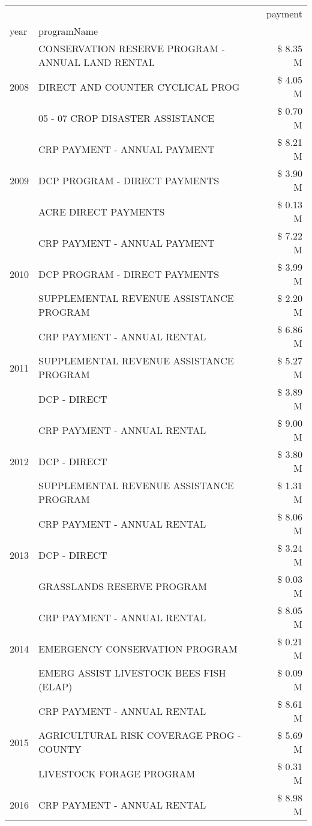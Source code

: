 \begin{tabular}{llr}
\toprule
 &  & payment \\
year & programName &  \\
\midrule
\multirow[t]{3}{*}{2008} & CONSERVATION RESERVE PROGRAM - ANNUAL LAND RENTAL & \$ 8.35 M \\
 & DIRECT AND COUNTER CYCLICAL PROG & \$ 4.05 M \\
 & 05 - 07 CROP DISASTER ASSISTANCE & \$ 0.70 M \\
\cline{1-3}
\multirow[t]{3}{*}{2009} & CRP PAYMENT - ANNUAL PAYMENT & \$ 8.21 M \\
 & DCP PROGRAM - DIRECT PAYMENTS & \$ 3.90 M \\
 & ACRE DIRECT PAYMENTS & \$ 0.13 M \\
\cline{1-3}
\multirow[t]{3}{*}{2010} & CRP PAYMENT - ANNUAL PAYMENT & \$ 7.22 M \\
 & DCP PROGRAM - DIRECT PAYMENTS & \$ 3.99 M \\
 & SUPPLEMENTAL REVENUE ASSISTANCE PROGRAM & \$ 2.20 M \\
\cline{1-3}
\multirow[t]{3}{*}{2011} & CRP PAYMENT - ANNUAL RENTAL & \$ 6.86 M \\
 & SUPPLEMENTAL REVENUE ASSISTANCE PROGRAM & \$ 5.27 M \\
 & DCP - DIRECT & \$ 3.89 M \\
\cline{1-3}
\multirow[t]{3}{*}{2012} & CRP PAYMENT - ANNUAL RENTAL & \$ 9.00 M \\
 & DCP - DIRECT & \$ 3.80 M \\
 & SUPPLEMENTAL REVENUE ASSISTANCE PROGRAM & \$ 1.31 M \\
\cline{1-3}
\multirow[t]{3}{*}{2013} & CRP PAYMENT - ANNUAL RENTAL & \$ 8.06 M \\
 & DCP - DIRECT & \$ 3.24 M \\
 & GRASSLANDS RESERVE PROGRAM & \$ 0.03 M \\
\cline{1-3}
\multirow[t]{3}{*}{2014} & CRP PAYMENT - ANNUAL RENTAL & \$ 8.05 M \\
 & EMERGENCY CONSERVATION PROGRAM & \$ 0.21 M \\
 & EMERG ASSIST LIVESTOCK BEES FISH (ELAP) & \$ 0.09 M \\
\cline{1-3}
\multirow[t]{3}{*}{2015} & CRP PAYMENT - ANNUAL RENTAL & \$ 8.61 M \\
 & AGRICULTURAL RISK COVERAGE PROG - COUNTY & \$ 5.69 M \\
 & LIVESTOCK FORAGE PROGRAM & \$ 0.31 M \\
\cline{1-3}
\multirow[t]{3}{*}{2016} & CRP PAYMENT - ANNUAL RENTAL & \$ 8.98 M \\

\end{tabular}
